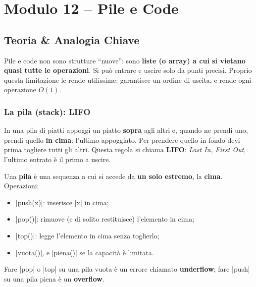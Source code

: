 \chapter{Modulo 12 -- Pile e Code}

\section{Teoria \& Analogia Chiave}

Pile e code non sono strutture ``nuove'': sono \textbf{liste (o array) a cui si
vietano quasi tutte le operazioni}. Si può entrare e uscire solo da punti precisi.
Proprio questa limitazione le rende utilissime: garantisce un ordine di uscita, e
rende ogni operazione $O(1)$.

\subsection*{La pila (stack): LIFO}

\begin{analogia}
In una pila di piatti appoggi un piatto \textbf{sopra} agli altri e, quando ne prendi
uno, prendi quello \textbf{in cima}: l'ultimo appoggiato. Per prendere quello in fondo
devi prima togliere tutti gli altri. Questa regola si chiama \textbf{LIFO}: \emph{Last
In, First Out}, l'ultimo entrato è il primo a uscire.
\end{analogia}

\begin{definizione}[: pila]
Una \textbf{pila} è una sequenza a cui si accede da \textbf{un solo estremo}, la
\textbf{cima}. Operazioni:
\begin{itemize}
  \item \cc|push(x)|: inserisce \cc|x| in cima;
  \item \cc|pop()|: rimuove (e di solito restituisce) l'elemento in cima;
  \item \cc|top()|: legge l'elemento in cima senza toglierlo;
  \item \cc|vuota()|, e \cc|piena()| se la capacità è limitata.
\end{itemize}
Fare \cc|pop| o \cc|top| su una pila vuota è un errore chiamato \textbf{underflow};
fare \cc|push| su una pila piena è un \textbf{overflow}.
\end{definizione}

